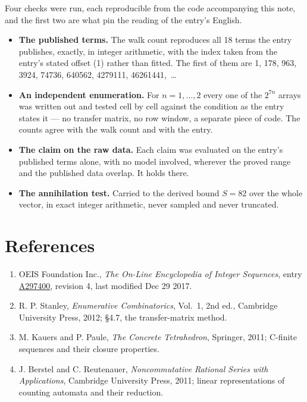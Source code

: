 \documentclass[11pt]{article}
\theoremstyle{definition}
\begin{document}
Four checks were run, each reproducible from the code accompanying this note, and the first two are what pin the reading of the entry's English.

\begin{itemize}

\item {\bfseries The published terms.} The walk count reproduces all 18 terms the entry publishes, exactly, in integer arithmetic, with the index taken from the entry's stated offset (1) rather than fitted. The first of them are 1, 178, 963, 3924, 74736, 640562, 4279111, 46261441,~\dots

\item {\bfseries An independent enumeration.} For $n = 1,\dots,2$ every one of the $2^{7n}$ arrays was written out and tested cell by cell against the condition as the entry states it --- no transfer matrix, no row window, a separate piece of code. The counts agree with the walk count and with the entry.

\item {\bfseries The claim on the raw data.} Each claim was evaluated on the entry's published terms alone, with no model involved, wherever the proved range and the published data overlap. It holds there.

\item {\bfseries The annihilation test.} Carried to the derived bound $S = 82$ over the whole vector, in exact integer arithmetic, never sampled and never truncated.

\end{itemize}

\section{References}

\begin{enumerate}

\item OEIS Foundation Inc., \emph{The On-Line Encyclopedia of Integer Sequences}, entry \href{https://oeis.org/A297400}{A297400}, revision 4, last modified Dec 29 2017.

\item R. P. Stanley, \emph{Enumerative Combinatorics}, Vol.~1, 2nd ed., Cambridge University Press, 2012; \S4.7, the transfer-matrix method.

\item M. Kauers and P. Paule, \emph{The Concrete Tetrahedron}, Springer, 2011; C-finite sequences and their closure properties.

\item J. Berstel and C. Reutenauer, \emph{Noncommutative Rational Series with Applications}, Cambridge University Press, 2011; linear representations of counting automata and their reduction.

\end{enumerate}
\end{document}
